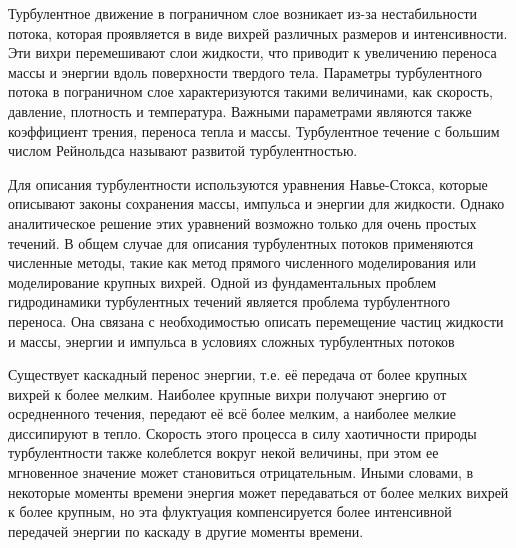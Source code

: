 	Турбулентное движение в пограничном слое возникает из-за нестабильности потока, которая проявляется в виде вихрей различных размеров и интенсивности. Эти вихри перемешивают слои жидкости, что приводит к увеличению переноса массы и энергии вдоль поверхности твердого тела. Параметры турбулентного потока в пограничном слое характеризуются такими величинами, как скорость, давление, плотность и температура. Важными параметрами являются также коэффициент трения, переноса тепла и массы. Турбулентное течение с большим числом Рейнольдса называют развитой турбулентностью.
	
	Для описания турбулентности используются уравнения Навье-Стокса, которые описывают законы сохранения массы, импульса и энергии для жидкости. Однако аналитическое решение этих уравнений возможно только для очень простых течений. В общем случае для описания турбулентных потоков применяются численные методы, такие как метод прямого численного моделирования или моделирование крупных вихрей. Одной из фундаментальных проблем гидродинамики турбулентных течений является проблема турбулентного переноса. Она связана с необходимостью описать перемещение частиц жидкости и массы, энергии и импульса в условиях сложных турбулентных потоков
	
	Существует каскадный перенос энергии, т.е. её передача от более крупных вихрей к более мелким. Наиболее крупные вихри получают энергию от осредненного течения, передают её всё более мелким, а наиболее мелкие диссипируют в тепло. Скорость этого процесса в силу хаотичности природы турбулентности также колеблется вокруг некой величины, при этом ее мгновенное значение может становиться отрицательным. Иными словами, в некоторые моменты времени энергия может передаваться от более мелких вихрей к более крупным, но эта флуктуация компенсируется более интенсивной передачей энергии по каскаду в другие моменты времени.

